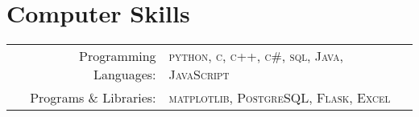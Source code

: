\documentclass[a4paper,12pt]{article} %
\begin{document}

\section{Computer Skills}

\begin{tabular}{rl}
Programming Languages: & \textsc{python}, \textsc{c}, \textsc{c++}, \textsc{c\#}, \textsc{sql}, \textsc{Java}, \textsc{JavaScript} \\

Programs \& Libraries: & \textsc{matplotlib}, \textsc{PostgreSQL}, \textsc{Flask}, \textsc{Excel}\\
\end{tabular}



\begin{comment}
\section{Interests and Activities}

Technology, Open-Source, Programming\\
Paradoxes in Decision Making, Psychoanalysis, Behavioural Finance\\
Football, Travelling
\end{comment}



\end{document}
